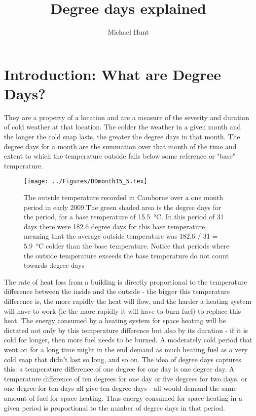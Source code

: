 \documentclass[parskip=half]{scrartcl}
\title{Degree days explained}
\author{Michael Hunt}
\date{}
\begin{document}
\maketitle

\section{Introduction: What are Degree Days?}

They are a property of a location and are a measure of the severity and duration of cold weather at that location. The colder the weather in a given month and the longer the cold snap lasts, the greater the degree days in that month. The degree days for a month are the summation over that month of the time and extent to which the temperature outside falls below some reference or "base" temperature.

\begin{figure}[ht]
\texttt{[image: ../Figures/DDmonth15\_5.tex]}
\caption{The outside temperature recorded in Camborne over a one month period in early 2009.The green shaded area is the degree days for the period, for a base temperature of \SI{15.5}{\celsius}. In this period of 31 days there were 182.6 degree days for this base temperature, meaning that the average outside temperature was 182.6 / 31 = \SI{5.9}{\celsius} colder than the base temperature. Notice that periods where the outside temperature exceeds the base temperature do not count towards degree days}
\label{fig:DDdata}
\end{figure}

The rate of heat loss from a building is directly proportional to the temperature difference between the inside and the outside - the bigger this temperature difference is, the more rapidly the heat will flow, and the harder a heating system will have to work (ie the more rapidly it will have to burn fuel)  to replace this heat. The energy consumed by a heating system for space heating will be dictated not only by this temperature difference but also by its duration - if it is cold for longer, then more fuel needs to be burned. A moderately cold period that went on for a long time might in the end demand as much heating fuel as a very cold snap that didn't last so long, and so on. The idea of degree days captures this: a temperature difference of one degree for one day is one degree day. A temperature difference of ten degrees for one day or five degrees for two days, or one degree for ten days all give ten degree days - all would demand the same amount of fuel for space heating. Thus energy consumed for space heating in a given period is proportional to the number of degree days in that period.
\end{document}
